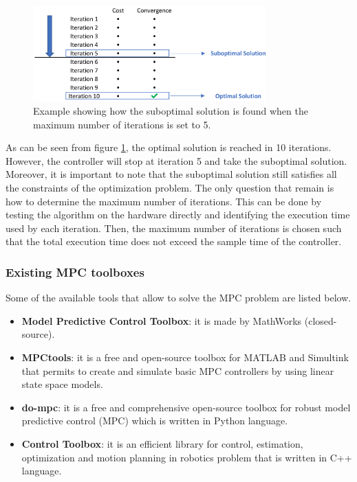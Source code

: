 \documentclass{thesisreport}
\begin{document}
\begin{figure}[h]
\centering
\includegraphics[width=0.8\textwidth]{Images/Control/Suboptimal_Solution.png}
\caption{Example showing how the suboptimal solution is found when the maximum number of iterations is set to 5.}
\label{Suboptimal_solution_example}
\end{figure}

\noindent As can be seen from figure \ref{Suboptimal_solution_example}, the optimal solution is reached in 10 iterations. However, the controller will stop at iteration 5 and take the suboptimal solution. Moreover, it is important to note that the suboptimal solution still satisfies all the constraints of the optimization problem. The only question that remain is how to determine the maximum number of iterations. This can be done by testing the algorithm on the hardware directly and identifying the execution time used by each iteration. Then, the maximum number of iterations is chosen such that the total execution time does not exceed the sample time of the controller.


  \subsubsection{Existing MPC toolboxes} Some of the available tools that allow to solve the MPC problem are listed below.
  
  \begin{itemize}
  	\item \textbf{Model Predictive Control Toolbox}\footnotemark : it is made by MathWorks (closed-source).
  	\item \textbf{MPCtools}\footnotemark : it is a free and open-source toolbox for MATLAB and Simultink that  permits to create and simulate basic MPC controllers by using linear state space models.
  	\item \textbf{do-mpc}\footnotemark : it is a free and comprehensive open-source toolbox for robust model predictive control (MPC) which is written in Python language.
  	\item \textbf{Control Toolbox}\footnotemark : it is an efficient library for control, estimation, optimization and motion planning in robotics problem that is written in C++ language.
  \end{itemize}
  
\end{document}
